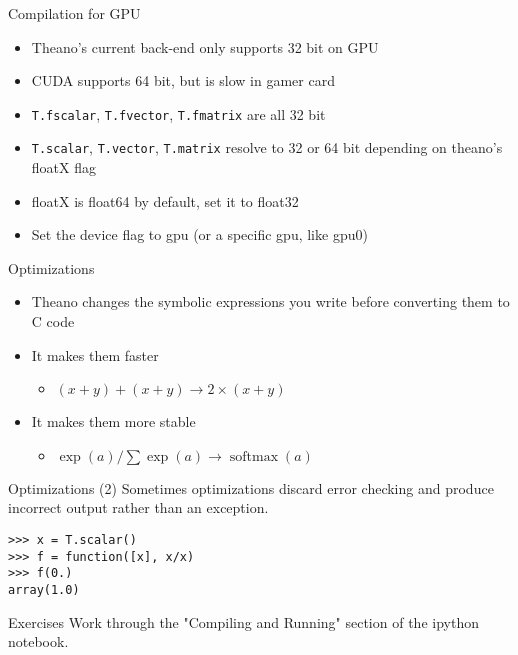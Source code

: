 \documentclass[utf8x,hyperref={pdfpagelabels=false}]{beamer}
\newcommand{\code}[1]{\lstinline[emph={[2]}]|#1|}
\begin{document}
\begin{frame}{Compilation for GPU}
  \begin{itemize}
  \item Theano's current back-end only supports 32 bit on GPU
  \item CUDA supports 64 bit, but is slow in gamer card
  \item \code{T.fscalar}, \code{T.fvector}, \code{T.fmatrix} are all 32 bit
  \item \code{T.scalar}, \code{T.vector}, \code{T.matrix} resolve to 32 or 64 bit depending on theano’s floatX flag
  \item floatX is float64 by default, set it to float32
  \item Set the device flag to gpu (or a specific gpu, like gpu0)
  \end{itemize}
\end{frame}

\begin{frame}{Optimizations}
  \begin{itemize}
  \item Theano changes the symbolic expressions
    you write before converting them to C code
  \item It makes them faster
  \begin{itemize}
  \item $(x+y)+(x+y) \to 2\times(x + y)$
  \end{itemize}
  \item It makes them more stable
  \begin{itemize}
  \item $\exp(a)/\sum{\exp(a)} \to \operatorname{softmax}(a)$
  \end{itemize}
  \end{itemize}
\end{frame}

\begin{frame}[fragile]{Optimizations (2)}
Sometimes optimizations discard error checking and produce incorrect output rather than an exception.
\begin{lstlisting}
>>> x = T.scalar()
>>> f = function([x], x/x)
>>> f(0.)
array(1.0)
\end{lstlisting}
\end{frame}

\begin{frame}{Exercises}
Work through the "Compiling and Running" section of the ipython notebook.
\end{frame}
\end{document}
